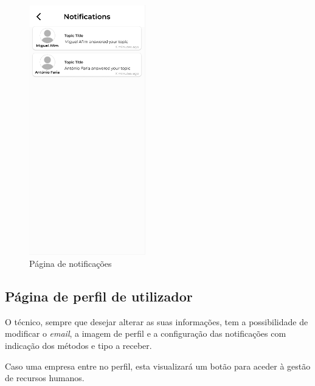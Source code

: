 \begin{figure}[htb]
    \centering
    \includegraphics[width=0.45\textwidth]{images/mockups/notifications.png}
    \caption{Página de notificações}
    \label{fig:29}
\end{figure}

\newpage

\subsection{Página de perfil de utilizador}

O técnico, sempre que desejar alterar as suas informações, tem a possibilidade de modificar o \textit{email}, a imagem de perfil e a configuração das notificações com indicação dos métodos e tipo a receber.

Caso uma empresa entre no perfil, esta visualizará um botão para aceder à gestão de recursos humanos.

